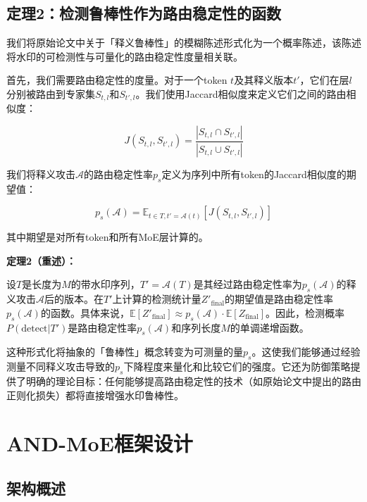 \documentclass[letterpaper,twocolumn,10pt]{article}
\begin{document}
\subsection{定理2：检测鲁棒性作为路由稳定性的函数}

我们将原始论文中关于「释义鲁棒性」的模糊陈述形式化为一个概率陈述，该陈述将水印的可检测性与可量化的路由稳定性度量相关联。

首先，我们需要路由稳定性的度量。对于一个token $t$及其释义版本$t'$，它们在层$l$分别被路由到专家集$S_{t,l}$和$S_{t',l}$。我们使用Jaccard相似度来定义它们之间的路由相似度：

\begin{equation}
J(S_{t,l}, S_{t',l}) = \frac{|S_{t,l} \cap S_{t',l}|}{|S_{t,l} \cup S_{t',l}|}
\end{equation}

我们将释义攻击$\mathcal{A}$的路由稳定性率$p_s$定义为序列中所有token的Jaccard相似度的期望值：

\begin{equation}
p_s(\mathcal{A}) = \mathbb{E}_{t \in T, t'=\mathcal{A}(t)} [J(S_{t,l}, S_{t',l})]
\end{equation}

其中期望是对所有token和所有MoE层计算的。

\textbf{定理2（重述）：}

设$T$是长度为$M$的带水印序列，$T' = \mathcal{A}(T)$是其经过路由稳定性率为$p_s(\mathcal{A})$的释义攻击$\mathcal{A}$后的版本。在$T'$上计算的检测统计量$Z'_{\text{final}}$的期望值是路由稳定性率$p_s(\mathcal{A})$的函数。具体来说，$\mathbb{E}[Z'_{\text{final}}] \approx p_s(\mathcal{A}) \cdot \mathbb{E}[Z_{\text{final}}]$。因此，检测概率$P(\text{detect}|T')$是路由稳定性率$p_s(\mathcal{A})$和序列长度$M$的单调递增函数。

这种形式化将抽象的「鲁棒性」概念转变为可测量的量$p_s$。这使我们能够通过经验测量不同释义攻击导致的$p_s$下降程度来量化和比较它们的强度。它还为防御策略提供了明确的理论目标：任何能够提高路由稳定性的技术（如原始论文中提出的路由正则化损失）都将直接增强水印鲁棒性。

\section{AND-MoE框架设计}

\subsection{架构概述}
\end{document}
